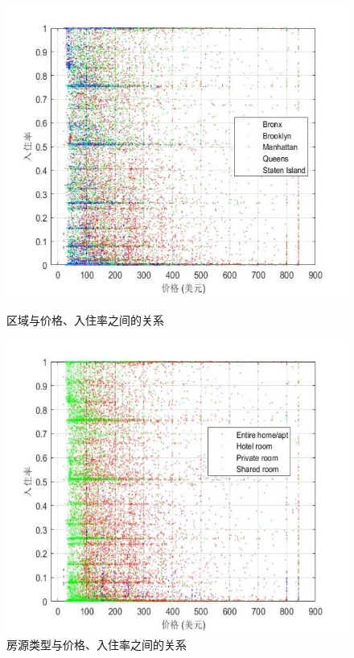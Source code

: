 \documentclass[12pt]{article}
\begin{document}
\begin{CJK}{UTF8}{gbsn}
	\begin{figure}[H]
		\centering
		\begin{minipage}[b]{0.45\textwidth}
			\centering
			\includegraphics[width=\linewidth]{pic/7.jpg}
			\caption{区域与价格、入住率之间的关系}
			\label{fig:7}
		\end{minipage}
		\hfill
		\begin{minipage}[b]{0.45\textwidth}
			\centering
			\includegraphics[width=\linewidth]{pic/8.jpg}
			\caption{房源类型与价格、入住率之间的关系}
			\label{fig:8}
		\end{minipage}
		

\end{figure}
\end{CJK}
\end{document}
